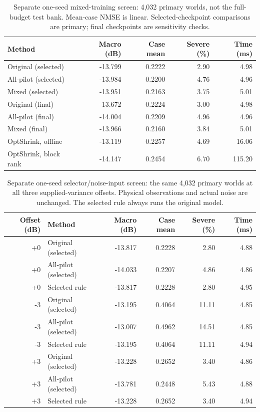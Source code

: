 \begin{table}[!t]
\caption{Separate one-seed mixed-training screen: 4,032 primary worlds, not the full-budget test bank. Mean-case NMSE is linear. Selected-checkpoint comparisons are primary; final checkpoints are sensitivity checks.}
\label{tab:training-mixed}\centering\footnotesize
\setlength{\tabcolsep}{3pt}
\begin{tabular}{@{}lrrrr@{}}\toprule
Method & Macro (dB) & Case mean & Severe (\%) & Time (ms)\\
\midrule
Original (selected) & -13.799 & 0.2222 & 2.90 & 4.98\\
All-pilot (selected) & -13.984 & 0.2200 & 4.76 & 4.96\\
Mixed (selected) & -13.951 & 0.2163 & 3.75 & 5.01\\
Original (final) & -13.672 & 0.2224 & 3.00 & 4.98\\
All-pilot (final) & -14.004 & 0.2209 & 4.96 & 4.96\\
Mixed (final) & -13.966 & 0.2160 & 3.84 & 5.01\\
OptShrink, offline & -13.119 & 0.2257 & 4.69 & 16.06\\
OptShrink, block rank & -14.147 & 0.2454 & 6.70 & 115.20\\
\bottomrule
\end{tabular}
\end{table}

\begin{table}[!t]
\caption{Separate one-seed selector/noise-input screen: the same 4,032 primary worlds at all three supplied-variance offsets. Physical observations and actual noise are unchanged. The selected rule always runs the original model.}
\label{tab:training-noise}\centering\footnotesize
\setlength{\tabcolsep}{3pt}
\begin{tabular}{@{}rlrrrr@{}}\toprule
Offset (dB) & Method & Macro (dB) & Case mean & Severe (\%) & Time (ms)\\
\midrule
+0 & Original (selected) & -13.817 & 0.2228 & 2.80 & 4.88\\
+0 & All-pilot (selected) & -14.033 & 0.2207 & 4.86 & 4.86\\
+0 & Selected rule & -13.817 & 0.2228 & 2.80 & 4.95\\
-3 & Original (selected) & -13.195 & 0.4064 & 11.11 & 4.85\\
-3 & All-pilot (selected) & -13.007 & 0.4962 & 14.51 & 4.85\\
-3 & Selected rule & -13.195 & 0.4064 & 11.11 & 4.94\\
+3 & Original (selected) & -13.228 & 0.2652 & 3.40 & 4.86\\
+3 & All-pilot (selected) & -13.781 & 0.2448 & 5.43 & 4.88\\
+3 & Selected rule & -13.228 & 0.2652 & 3.40 & 4.94\\
\bottomrule
\end{tabular}
\end{table}

